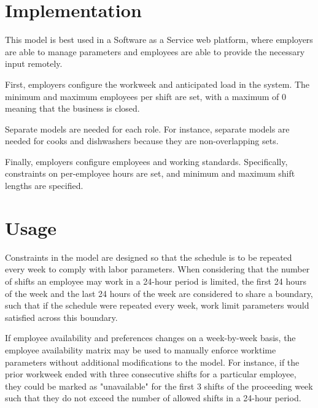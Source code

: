 \section{Implementation}

This model is best used in a Software as a Service web platform, where employers are able to manage parameters and employees are able to provide the necessary input remotely. 

First, employers configure the workweek and anticipated load in the system. The minimum and maximum employees per shift are set, with a maximum of 0 meaning that the business is closed. 

Separate models are needed for each role. For instance, separate models are needed for cooks and dishwashers because they are non-overlapping sets.

Finally, employers configure employees and working standards. Specifically, constraints on per-employee hours are set, and minimum and maximum shift lengths are specified. 

\section{Usage}

Constraints in the model are designed so that the schedule is to be repeated every week to comply with labor parameters. When considering that the number of shifts an employee may work in a 24-hour period is limited, the first 24 hours of the week and the last 24 hours of the week are considered to share a boundary, such that if the schedule were repeated every week, work limit parameters would satisfied across this boundary. 

If employee availability and preferences changes on a week-by-week basis, the employee availability matrix may be used to manually enforce worktime parameters without additional modifications to the model. For instance, if the prior workweek ended with three consecutive shifts for a particular employee, they could be marked as "unavailable" for the first 3 shifts of the proceeding week such that they do not exceed the number of allowed shifts in a 24-hour period.  






